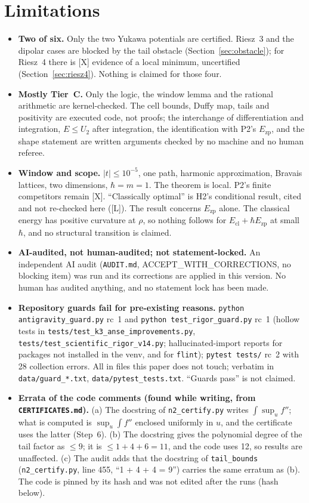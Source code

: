 \documentclass[10pt]{article}
\newcommand{\tier}[1]{\textsf{[#1]}}
\newcommand{\tL}{\tier{L}}
\newcommand{\tX}{\tier{X}}
\newcommand{\Ezp}{E_{\mathrm{zp}}}
\begin{document}
\section{Limitations}\label{sec:lim}
\begin{itemize}\itemsep=1pt
\item \textbf{Two of six.} Only the two Yukawa potentials are certified. Riesz~3 and the dipolar cases are blocked by the tail obstacle (Section~\ref{sec:obstacle}); for Riesz~4 there is \tX{} evidence of a local minimum, uncertified (Section~\ref{sec:riesz4}). Nothing is claimed for those four.
\item \textbf{Mostly Tier~C.} Only the logic, the window lemma and the rational arithmetic are kernel-checked. The cell bounds, Duffy map, tails and positivity are executed code, not proofs; the interchange of differentiation and integration, $E\le U_2$ after integration, the identification with P2's $\Ezp$, and the shape statement are written arguments checked by no machine and no human referee.
\item \textbf{Window and scope.} $|t|\le10^{-5}$, one path, harmonic approximation, Bravais lattices, two dimensions, $\hbar=m=1$. The theorem is local. P2's finite competitors remain \tX. ``Classically optimal'' is H2's conditional result, cited and not re-checked here (\tL). The result concerns $\Ezp$ alone. The classical energy has positive curvature at $\rho$, so nothing follows for $E_{\mathrm{cl}}+\hbar\Ezp$ at small $\hbar$, and no structural transition is claimed.
\item \textbf{AI-audited, not human-audited; not statement-locked.} An independent AI audit (\texttt{AUDIT.md}, ACCEPT\_WITH\_CORRECTIONS, no blocking item) was run and its corrections are applied in this version. No human has audited anything, and no statement lock has been made.
\item \textbf{Repository guards fail for pre-existing reasons.} \texttt{python antigravity\_guard.py} rc~1 and \texttt{python test\_rigor\_guard.py} rc~1 (hollow tests in \texttt{tests/test\_k3\_anse\_improvements.py}, \texttt{tests/test\_scientific\_rigor\_v14.py}; hallucinated-import reports for packages not installed in the venv, and for \texttt{flint}); \texttt{pytest tests/} rc~2 with 28 collection errors. All in files this paper does not touch; verbatim in \texttt{data/guard\_*.txt}, \texttt{data/pytest\_tests.txt}. ``Guards pass'' is not claimed.
\item \textbf{Errata of the code comments (found while writing, from \texttt{CERTIFICATES.md}).} (a) The docstring of \texttt{n2\_certify.py} writes $\int\sup_uf''$; what is computed is $\sup_u\int f''$ enclosed uniformly in $u$, and the certificate uses the latter (Step~6). (b) The docstring gives the polynomial degree of the tail factor as $\le9$; it is $\le1+4+6=11$, and the code uses 12, so results are unaffected. (c) The audit adds that the docstring of \texttt{tail\_bounds} (\texttt{n2\_certify.py}, line 455, ``1 + 4 + 4 = 9'') carries the same erratum as (b). The code is pinned by its hash and was not edited after the runs (hash below).

\end{itemize}
\end{document}
